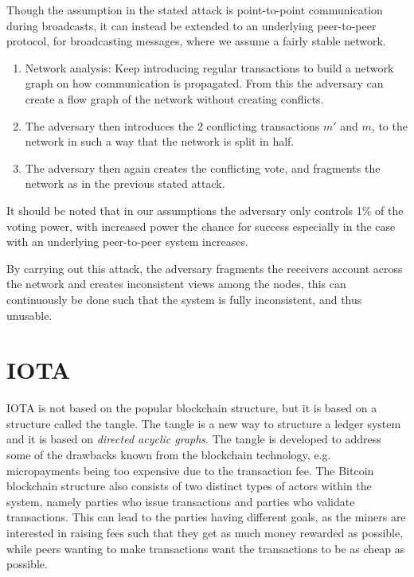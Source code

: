 Though the assumption in the stated attack is point-to-point communication during broadcasts, it can instead be extended to an underlying peer-to-peer protocol, for broadcasting messages, where we assume a fairly stable network.

\begin{enumerate}
    \item Network analysis: Keep introducing regular transactions to build a network graph on how communication is propagated. From this the adversary can create a flow graph of the network without creating conflicts. 
    \item The adversary then introduces the 2 conflicting transactions $m'$ and $m$, to the network in such a way that the network is split in half.
    \item The adversary then again creates the conflicting vote, and fragments the network as in the previous stated attack.
\end{enumerate}

It should be noted that in our assumptions the adversary only controls 1\% of the voting power, with increased power the chance for success especially in the case with an underlying peer-to-peer system increases.

By carrying out this attack, the adversary fragments the receivers account across the network and creates inconsistent views among the nodes, this can continuously be done such that the system is fully inconsistent, and thus unusable.


\section{IOTA}
IOTA is not based on the popular blockchain structure, but it is based on a structure called the tangle. The tangle is a new way to structure a ledger system and it is based on \emph{directed acyclic graphs}. The tangle is developed to address some of the drawbacks known from the blockchain technology, e.g. micropayments being too expensive due to the transaction fee. The Bitcoin blockchain structure also consists of two distinct types of actors within the system, namely parties who issue transactions and parties who validate transactions. This can lead to the parties having different goals, as the miners are interested in raising fees such that they get as much money rewarded as possible, while peers wanting to make transactions want the transactions to be as cheap as possible.\\


